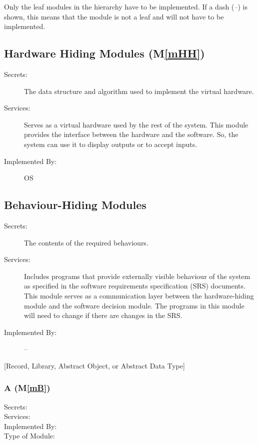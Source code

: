 \documentclass[12pt, titlepage]{article}
\newcommand{\mref}[1]{M\ref{#1}}
\begin{document}
Only the leaf modules in the hierarchy have to be implemented. If a dash
(\emph{--}) is shown, this means that the module is not a leaf and will not have
to be implemented.

\subsection{Hardware Hiding Modules (\mref{mHH})}

\begin{description}
\item[Secrets:]The data structure and algorithm used to implement the virtual
  hardware.
\item[Services:]Serves as a virtual hardware used by the rest of the
  system. This module provides the interface between the hardware and the
  software. So, the system can use it to display outputs or to accept inputs.
\item[Implemented By:] OS
\end{description}

\subsection{Behaviour-Hiding Modules}

\begin{description}
\item[Secrets:]The contents of the required behaviours.
\item[Services:]Includes programs that provide externally visible behaviour of
  the system as specified in the software requirements specification (SRS)
  documents. This module serves as a communication layer between the
  hardware-hiding module and the software decision module. The programs in this
  module will need to change if there are changes in the SRS.
\item[Implemented By:] --
\end{description}

[Record, Library, Abstract Object, or Abstract Data Type]
\subsubsection{A (\mref{mB})}
\begin{description}
\item[Secrets:] 
\item[Services:]
\item[Implemented By:] 
\item[Type of Module:] 
\end{description}
\end{document}
